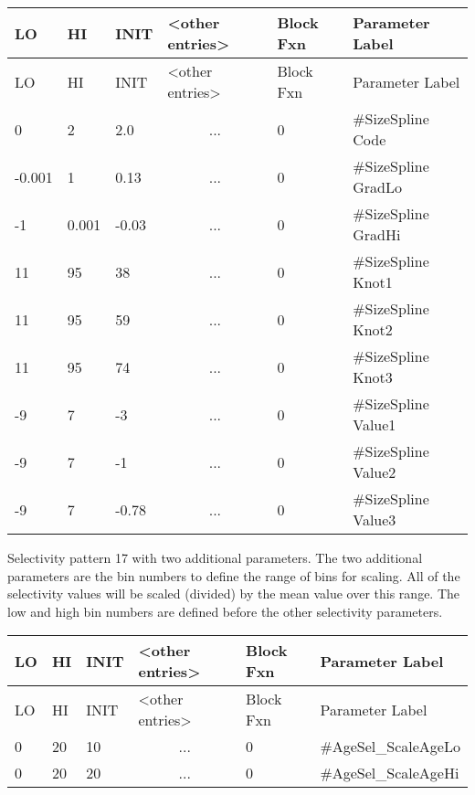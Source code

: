 \begin{longtable}{p{1cm} p{1cm} p{1cm} p{2.9cm}  p{1.9cm}  p{4.2cm}}
	\hline
	LO \Tstrut & HI & INIT  &  <other entries> & Block Fxn & Parameter Label\Bstrut\\
	\hline
	\endfirsthead

	\hline
	LO \Tstrut & HI & INIT & <other entries> & Block Fxn & Parameter Label\Bstrut\\
	\hline
	\endhead

	0 \Tstrut &     2  &   2.0 & \multicolumn{1}{c}{...} & 0 & \#SizeSpline Code\\
	-0.001    & 	 1 &  0.13 & \multicolumn{1}{c}{...} & 0 & \#SizeSpline GradLo\\
	-1        & 0.001  & -0.03 & \multicolumn{1}{c}{...} & 0 & \#SizeSpline GradHi\\
	11        & 	95 & 	38 & \multicolumn{1}{c}{...} & 0 & \#SizeSpline Knot1\\
	11        & 	95 & 	59 & \multicolumn{1}{c}{...} & 0 & \#SizeSpline Knot2\\
	11        & 	95 & 	74 & \multicolumn{1}{c}{...} & 0 & \#SizeSpline Knot3\\
	-9        & 	 7 & 	-3 & \multicolumn{1}{c}{...} & 0 & \#SizeSpline Value1\\
	-9        &   	 7 & 	-1 & \multicolumn{1}{c}{...} & 0 & \#SizeSpline Value2\\
	-9        & 	 7 & -0.78 & \multicolumn{1}{c}{...} & 0 & \#SizeSpline Value3 \Bstrut\\
	\hline
\end{longtable}


Selectivity pattern 17 with two additional parameters. The two additional parameters are the bin numbers to define the range of bins for scaling. All of the selectivity values will be scaled (divided) by the mean value over this range. The low and high bin numbers are defined before the other selectivity parameters.

	\begin{longtable}{p{1cm} p{1cm} p{1cm} p{2.9cm}  p{1.9cm}  p{4.2cm}}
		\hline
		LO \Tstrut & HI & INIT  &  <other entries> & Block Fxn & Parameter Label\Bstrut\\
		\hline
		\endfirsthead
	
		\hline
		LO \Tstrut & HI & INIT & <other entries> & Block Fxn & Parameter Label\Bstrut\\
		\hline
		\endhead

		0 & 20 & 10 & \multicolumn{1}{c}{...} & 0 & \#AgeSel\_ScaleAgeLo \Tstrut\\
		0 & 20 & 20 & \multicolumn{1}{c}{...} & 0 & \#AgeSel\_ScaleAgeHi \Bstrut\\
		\hline
	\end{longtable}


